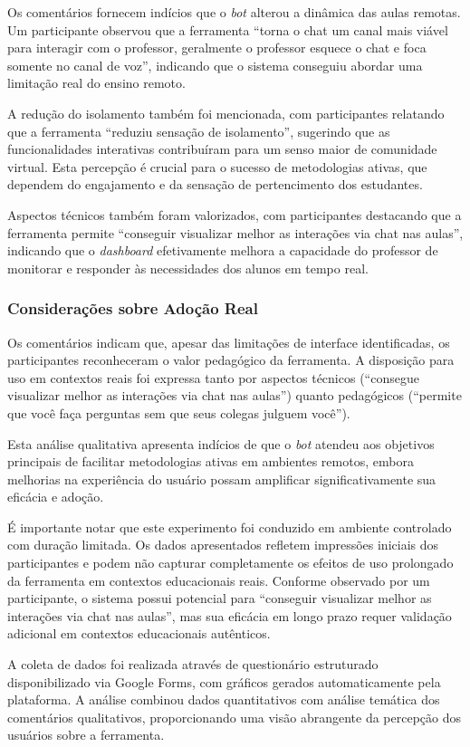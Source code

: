 Os comentários fornecem indícios que o \textit{bot} alterou a dinâmica das aulas
remotas. Um participante observou que a ferramenta ``torna o chat um canal mais
viável para interagir com o professor, geralmente o professor esquece o chat e
foca somente no canal de voz'', indicando que o sistema conseguiu abordar uma
limitação real do ensino remoto.

A redução do isolamento também foi mencionada, com participantes relatando que a
ferramenta ``reduziu sensação de isolamento'', sugerindo que as funcionalidades
interativas contribuíram para um senso maior de comunidade virtual. Esta
percepção é crucial para o sucesso de metodologias ativas, que dependem do
engajamento e da sensação de pertencimento dos estudantes.

Aspectos técnicos também foram valorizados, com participantes destacando que a
ferramenta permite ``conseguir visualizar melhor as interações via chat nas
aulas'', indicando que o \textit{dashboard} efetivamente melhora a capacidade do
professor de monitorar e responder às necessidades dos alunos em tempo real.

\subsubsection{Considerações sobre Adoção Real}
\label{subsec:consideracoes-adocao-real}

Os comentários indicam que, apesar das limitações de interface identificadas, os
participantes reconheceram o valor pedagógico da ferramenta. A disposição para
uso em contextos reais foi expressa tanto por aspectos técnicos (``consegue
visualizar melhor as interações via chat nas aulas'') quanto pedagógicos
(``permite que você faça perguntas sem que seus colegas julguem você'').

Esta análise qualitativa apresenta indícios de que o \textit{bot} atendeu aos
objetivos principais de facilitar metodologias ativas em ambientes remotos,
embora melhorias na experiência do usuário possam amplificar significativamente
sua eficácia e adoção.

É importante notar que este experimento foi conduzido em ambiente controlado
com duração limitada. Os dados apresentados refletem impressões iniciais dos
participantes e podem não capturar completamente os efeitos de uso prolongado
da ferramenta em contextos educacionais reais. Conforme observado por um
participante, o sistema possui potencial para ``conseguir visualizar melhor as
interações via chat nas aulas'', mas sua eficácia em longo prazo requer
validação adicional em contextos educacionais autênticos.

A coleta de dados foi realizada através de questionário estruturado
disponibilizado via Google Forms, com gráficos gerados automaticamente pela
plataforma. A análise combinou dados quantitativos com análise temática dos
comentários qualitativos, proporcionando uma visão abrangente da percepção dos
usuários sobre a ferramenta.
